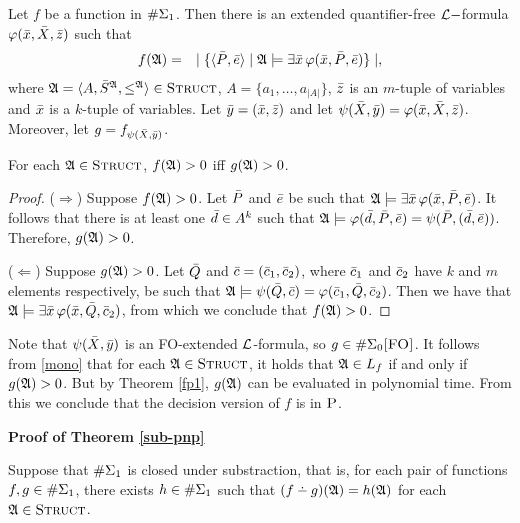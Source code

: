 Let $f$ be a function in $\E{1}$. Then there is an extended quantifier-free $\L-$formula $\varphi(\x,\X,\z)$ such that
\begin{eqnarray*}
	f(\A) &=& \mid \{ \langle\P,\e\rangle \mid \A \models \exists \x \, \varphi(\x,\P,\e) \} \mid,
\end{eqnarray*}
where $\A = \langle A, \S^{\A}, \leq^{\A} \rangle \in \str$, $A = \{a_1,\ldots,a_{\vert A \vert}\}$, $\z$ is an $m$-tuple of variables and $\x$ is a $k$-tuple of variables. Let $\y = (\x,\z)$ and let $\psi(\X,\y) = \varphi(\x,\X,\z)$. Moreover, let $g = f_{\psi(\X,\y)}$.
\begin{claim} \label{mono}
	For each $\A \in \str$, $f(\A) > 0$ iff $g(\A) > 0$.
\end{claim}
\begin{proof}
	($\Rightarrow$) Suppose $f(\A) > 0$. Let $\P$ and $\e$ be such that $\A \models \exists \x \, \varphi(\x,\P,\e)$. It follows that there is at least one $\d \in A^k$ such that $\A \models \varphi(\d,\P,\e) = \psi(\P,(\d,\e))$. Therefore, $g(\A) > 0$. 
	
	($\Leftarrow$) Suppose $g(\A) > 0$. Let $\Q$ and $\c = (\c_1,\c_2)$, where $\c_1$ and $\c_2$ have $k$ and $m$ elements respectively, be such that $\A \models \psi(\Q,\c) = \varphi(\c_1,\Q,\c_2)$. Then we have that $\A \models \exists \x \, \varphi(\x,\Q,\c_2)$, from which we conclude that $f(\A) > 0$.
\end{proof}
Note that $\psi(\X,\y)$ is an {\sc FO}-extended $\L$-formula, so $g \in\XE{0}$. It follows from \ref{mono} that for each $\A \in \str$, it holds that $\A \in L_f$ if and only if $g(\A) > 0$. But by Theorem \ref{fp1}, $g(\A)$ can be evaluated in polynomial time. From this we conclude that the decision version of $f$ is in $\ptime$.
	
\textbf{Proof of Theorem \ref{sub-pnp}}

Suppose that $\E{1}$ is closed under substraction, that is, for each pair of functions $f,g\in \E{1}$, there exists $h\in\E{1}$ such that $(f\dotminus g)(\A) = h(\A)$ for each $\A\in\str$.

